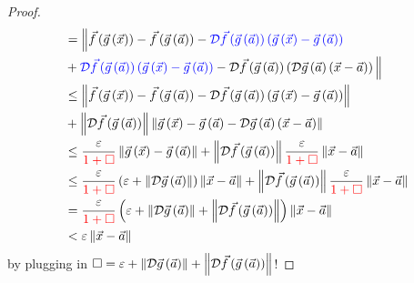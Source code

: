 \documentclass[main.tex]{subfiles}
\begin{document}
\begin{proof}
\begin{align*}
        &= \Big\lVert\vf\parens{\vg\parens{\vx}} - \vf\parens{\vg\parens{\va}} - \begingroup\color{blue}\mathcal{D}\vf\parens{\vg\parens{\va}}\parens{\vg\parens{\vx} - \vg\parens{\va}}\endgroup \\
        &+ \begingroup\color{blue}\mathcal{D}\vf\parens{\vg\parens{\va}}\parens{\vg\parens{\vx} - \vg\parens{\va}} \endgroup - \mathcal{D}\vf\parens{\vg\parens{\va}}\parens{\mathcal{D}\vg\parens{\va}\parens{\vx - \va}}\Big\rVert \\
        &\le \norm{\vf\parens{\vg\parens{\vx}} - \vf\parens{\vg\parens{\va}} - \mathcal{D}\vf\parens{\vg\parens{\va}}\parens{\vg\parens{\vx} - \vg\parens{\va}}} \\
        &+ \norm{\mathcal{D}\vf\parens{\vg\parens{\va}}}\norm{\vg\parens{\vx} - \vg\parens{\va} - \mathcal{D}\vg\parens{\va}\parens{\vx - \va}} \\
        &\le \frac{\varepsilon}{\begingroup\color{red}1 + \Box\endgroup}\norm{\vg\parens{\vx} - \vg\parens{\va}} + \norm{\mathcal{D}\vf\parens{\vg\parens{\va}}}\frac{\varepsilon}{\begingroup\color{red}1 + \Box\endgroup}\norm{\vx - \va} \\
        &\le \frac{\varepsilon}{\begingroup\color{red}1 + \Box\endgroup}\parens{\varepsilon + \norm{\mathcal{D}\vg\parens{\va}}}\norm{\vx - \va} + \norm{\mathcal{D}\vf\parens{\vg\parens{\va}}}\frac{\varepsilon}{\begingroup\color{red}1 + \Box\endgroup}\norm{\vx - \va} \\
        &= \frac{\varepsilon}{\begingroup\color{red}1 + \Box\endgroup}\parens{\varepsilon + \norm{\mathcal{D}\vg\parens{\va}} + \norm{\mathcal{D}\vf\parens{\vg\parens{\va}}}}\norm{\vx - \va} \\
        &< \varepsilon\norm{\vx - \va}
    \end{align*}
    by plugging in $\Box = \varepsilon + \left\lVert \mathcal{D}\vec{g}\left( \vec{a} \right) \right\rVert + \left\lVert \mathcal{D}\vec{f}\left( \vec{g}\left( \vec{a} \right) \right) \right\rVert$!
\end{proof}
\end{document}

